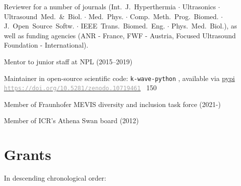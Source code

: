 \documentclass[11pt, a4paper]{awesome-cv}
\begin{document}
\begin{cventries}
{}
{}
{\vspace*{-0.5cm}
\begin{cvitems}
\item Reviewer for a number of journals (Int.~J.~Hyperthermia $\cdot$ Ultrasonics $\cdot$ Ultrasound~Med.~\&~Biol. $\cdot$ Med.~Phys. $\cdot$ Comp.~Meth.~Prog.~Biomed. $\cdot$ J.~Open~Source~Softw. $\cdot$ IEEE~Trans.~Biomed.~Eng. $\cdot$ Phys.~Med.~Biol.), as well as funding agencies (ANR - France, FWF - Austria, Focused Ultrasound Foundation - International).
\item Mentor to junior staff at NPL (2015--2019)
\item Maintainer in open-source scientific code: \texttt{k-wave-python} \href{https://github.com/waltsims/k-wave-python}{}, available via \href{https://pypi.org/project/k-Wave-python/}{pypi} \newline{}%
\href{https://doi.org/10.5281/zenodo.10719461}{\textcolor{darkgray}{\texttt{https://doi.org/10.5281/zenodo.10719461}}} \hspace*{2cm} \faStarO ~150
\end{cvitems}}

{}
{}
{\vspace*{-0.5cm} %
\begin{cvitems}
\item Member of Fraunhofer MEVIS diversity and inclusion task force (2021-)
\item Member of ICR's Athena Swan board (2012)
\end{cvitems}}
%
\end{cventries}

\newpage
\hypertarget{grants}{\section{Grants}\label{grants}}

In descending chronological order:
\end{document}
